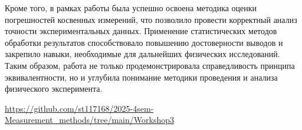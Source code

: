 Кроме того, в рамках работы была успешно освоена методика оценки погрешностей косвенных измерений, что позволило провести корректный анализ точности экспериментальных данных. Применение статистических методов обработки результатов способствовало повышению достоверности выводов и закрепило навыки, необходимые для дальнейших физических исследований. Таким образом, работа не только продемонстрировала справедливость принципа эквивалентности, но и углубила понимание методики проведения и анализа физического эксперимента.

\begin{thebibliography}{9}

\url{https://github.com/st117168/2025-4sem-Measurement_methods/tree/main/Workshop3} 

\end{thebibliography}


